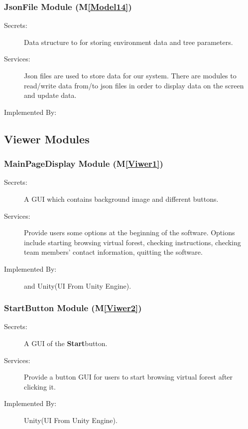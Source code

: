 \documentclass[12pt, titlepage]{article}
\newcommand{\mref}[1]{M\ref{#1}}
\begin{document}
\subsubsection{JsonFile Module (\mref{Model14})}
\begin{description}
\item[Secrets:] Data structure to for storing environment data and tree parameters.
\item[Services:] Json files are used to store data for our system. There are modules to 
read/write data from/to json files in order to display data on the screen and update data.
\item[Implemented By:] \progname{}
\end{description}

\subsection{Viewer Modules}

\subsubsection{MainPageDisplay Module (\mref{Viwer1})}
\begin{description}
\item[Secrets:] A GUI which contains background image and different buttons.
\item[Services:] Provide users some options at the beginning of the software. Options include
starting browsing virtual forest, checking instructions, checking team members' contact
information, quitting the software.
\item[Implemented By:] \progname{} and Unity(UI From Unity Engine).
\end{description}



\renewcommand{\bt}{\textbf{Start}}
\subsubsection{StartButton Module (\mref{Viwer2})}
\begin{description}
\item[Secrets:] A GUI of the \bt button.
\item[Services:] Provide a button GUI for users to start browsing virtual forest after 
clicking it.
\item[Implemented By:] Unity(UI From Unity Engine).
\end{description}
\end{document}
